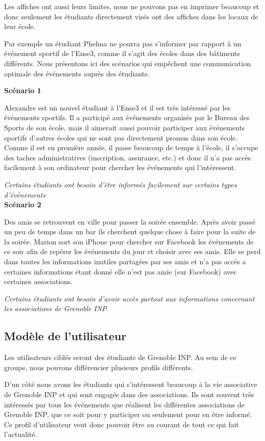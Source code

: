 \documentclass[a4paper, 11px]{article}
\begin{document}
Les affiches ont aussi leurs limites, nous ne pouvons pas en imprimer beaucoup et donc seulement les étudiants directement visés ont des affiches dans les locaux de leur école.

Par exemple un étudiant Phelma ne pourra pas s'informer par rapport à un événement sportif de l'Ense3, comme il s'agit des écoles dans des bâtiments différents.
Nous présentons ici des scénarios qui empêchent une communication optimale des événements auprès des étudiants.

{\bf Scénario 1}

Alexandre est un nouvel étudiant à l'Ense3 et il est très intéressé par les événements sportifs. Il a participé aux événements organisés par le Bureau des Sports de son école, mais il aimerait aussi pouvoir participer aux événements sportifs d'autres écoles qui ne sont pas directement promus dans son école. Comme il est en première année, il passe beaucoup de temps à l'école, il s'occupe des taches administratives (inscription, assurance, etc.) et donc il n'a pas accès facilement à son ordinateur pour chercher les événements qui l'intéressent.

\textit{Certains étudiants ont besoin d'être informés facilement sur certains types d'événements}\\

{\bf Scénario 2}

Des amis se retrouvent en ville pour passer la soirée ensemble. Après avoir passé un peu de temps dans un bar ils cherchent quelque chose à faire pour la suite de la soirée. Marion sort son iPhone pour chercher sur Facebook les événements de ce soir afin de repérer les événements du jour et choisir avec ses amis. Elle se perd dans toutes les informations inutiles partagées par ses amis et n'a pas accès a certaines informations étant donné elle n'est pas amie (sur Facebook) avec certaines associations.

\textit{Certains étudiants ont besoin d'avoir accès partout aux informations concernant les associations de Grenoble INP}

\subsection{Modèle de l'utilisateur}

Les utilisateurs ciblés seront des étudiants de Grenoble INP. Au sein de ce groupe, nous pouvons différencier plusieurs profils différents.

D'un côté nous avons les étudiants qui s'intéressent beaucoup à la vie associative de Grenoble INP et qui sont engagés dans des associations. Ils sont souvent très intéressés par tous les événements que réalisent les différentes associations de Grenoble INP, que ce soit pour y participer ou seulement pour en être informé. Ce profil d'utilisateur veut donc pouvoir être au courant de tout ce qui fait l'actualité.
\end{document}
